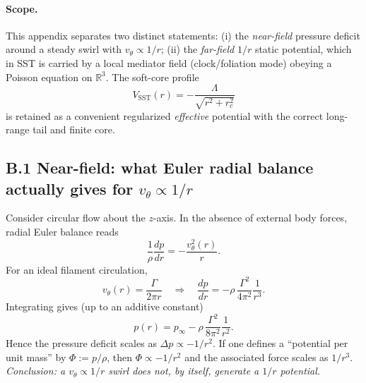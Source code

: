 \documentclass[10pt,reprint,aps,onecolumn,nofootinbib]{revtex4-2}
\begin{document}
    \paragraph{Scope.}
    This appendix separates two distinct statements:
    (i) the \emph{near-field} pressure deficit around a steady swirl with $v_\theta\propto 1/r$;
    (ii) the \emph{far-field} $1/r$ static potential, which in SST is carried by a local mediator field
    (clock/foliation mode) obeying a Poisson equation on $\mathbb{R}^3$.
    The soft-core profile
    \begin{equation}
    V_{\mathrm{SST}}(r)=-\frac{\Lambda}{\sqrt{r^2+r_c^2}}
    \label{eq:VSST_softcore}
    \end{equation}
    is retained as a convenient regularized \emph{effective} potential with the correct long-range tail and finite core.

    \subsection*{B.1 Near-field: what Euler radial balance actually gives for $v_\theta\propto 1/r$}
    Consider circular flow about the $z$-axis. In the absence of external body forces, radial Euler balance reads
    \begin{equation}
    \frac{1}{\rho}\frac{dp}{dr}=-\frac{v_\theta^2(r)}{r}.
    \label{eq:euler_radial}
    \end{equation}
    For an ideal filament circulation,
    \begin{equation}
    v_\theta(r)=\frac{\Gamma}{2\pi r}
    \quad\Rightarrow\quad
    \frac{dp}{dr}=-\rho\,\frac{\Gamma^2}{4\pi^2}\frac{1}{r^3}.
    \end{equation}
    Integrating gives (up to an additive constant)
    \begin{equation}
    p(r)=p_\infty-\rho\,\frac{\Gamma^2}{8\pi^2}\frac{1}{r^2}.
    \label{eq:pressure_deficit}
    \end{equation}
    Hence the pressure deficit scales as $\Delta p\propto -1/r^2$.
    If one defines a ``potential per unit mass'' by $\Phi:=p/\rho$, then $\Phi\propto -1/r^2$ and the associated force scales as $1/r^3$.
    \emph{Conclusion: a $v_\theta\propto 1/r$ swirl does not, by itself, generate a $1/r$ potential.}
\end{document}
